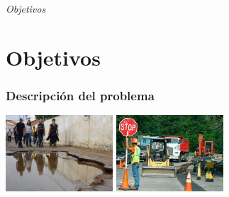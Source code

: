 \documentclass{beamer}
\begin{document}
\section*{}
\begin{frame}{}
  \centering \Huge
  \emph{Objetivos}
\end{frame}

\section{Objetivos}
\begin{frame}
	\frametitle{Descripción del problema}
	\begin{center}
		\includegraphics[width=0.3\textwidth]{figs/dana.jpg} \hspace{0.5cm}
		\includegraphics[width=0.3\textwidth]{figs/seguridad.jpg}
	\end{center}
	
	\vspace{0.5cm}  %
	

\end{frame}
\end{document}
